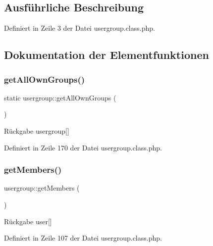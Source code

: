 \subsection{Ausführliche Beschreibung}


Definiert in Zeile 3 der Datei usergroup.\+class.\+php.



\subsection{Dokumentation der Elementfunktionen}
\mbox{\label{classusergroup_a44543b94c4d5a71ba233780522b753b9}} 
\subsubsection{\texorpdfstring{get\+All\+Own\+Groups()}{getAllOwnGroups()}}
{\footnotesize\ttfamily static usergroup\+::get\+All\+Own\+Groups (\begin{DoxyParamCaption}{ }\end{DoxyParamCaption})\hspace{0.3cm}{\ttfamily [static]}}

\begin{DoxyReturn}{Rückgabe}
usergroup\mbox{[}\mbox{]} 
\end{DoxyReturn}


Definiert in Zeile 170 der Datei usergroup.\+class.\+php.

\mbox{\label{classusergroup_aa7a79507fe7cc6fa64e495be5cb893fd}} 
\subsubsection{\texorpdfstring{get\+Members()}{getMembers()}}
{\footnotesize\ttfamily usergroup\+::get\+Members (\begin{DoxyParamCaption}{ }\end{DoxyParamCaption})}

\begin{DoxyReturn}{Rückgabe}
user\mbox{[}\mbox{]} 
\end{DoxyReturn}


Definiert in Zeile 107 der Datei usergroup.\+class.\+php.

